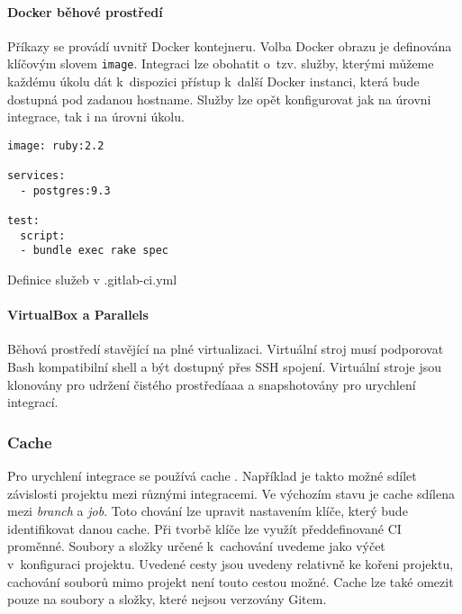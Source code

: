 \paragraph{Docker běhové prostředí}

Příkazy se provádí uvnitř Docker kontejneru.
Volba Docker obrazu je definována klíčovým slovem \verb|image|.
Integraci lze obohatit o~tzv. služby, kterými můžeme každému úkolu dát k~dispozici přístup k~další Docker instanci, která bude dostupná pod zadanou hostname.
Služby lze opět konfigurovat jak na úrovni integrace, tak i na úrovni úkolu.

\begin{listing}[ht]
\begin{verbatim}
image: ruby:2.2

services:
  - postgres:9.3

test:
  script:
  - bundle exec rake spec
\end{verbatim}
\caption{Definice služeb v .gitlab-ci.yml}
\end{listing}

\paragraph{VirtualBox a Parallels}

Běhová prostředí stavějící na plné virtualizaci.
Virtuální stroj musí podporovat Bash kompatibilní shell a být dostupný přes SSH spojení.
Virtuální stroje jsou klonovány pro udržení čistého prostředíaaa a snapshotovány pro urychlení integrací.


\subsubsection{Cache}


Pro urychlení integrace se používá cache .
Například je takto možné sdílet závislosti projektu mezi různými integracemi.
Ve výchozím stavu je cache sdílena mezi \textit{branch} a \textit{job}.
Toto chování lze upravit nastavením klíče, který bude identifikovat danou cache.
Při tvorbě klíče lze využít předdefinované CI proměnné. 
Soubory a složky určené k~cachování uvedeme jako výčet v~konfiguraci projektu.
Uvedené cesty jsou uvedeny relativně ke kořeni projektu, cachování souborů mimo projekt není touto cestou možné. %
Cache lze také omezit pouze na soubory a složky, které nejsou verzovány Gitem.

